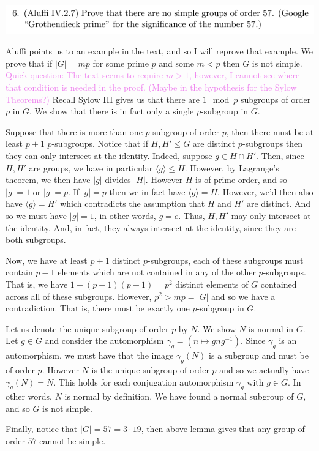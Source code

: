 \documentclass[12pt,letterpaper,boxed]{hmcpset}
\newcommand{\wg}[1]{\textcolor{violet}{#1}}
\newcommand{\abs}[1]{\left|#1\right|}
\newcommand{\inv}{^{-1}}
\newcommand{\anglee}[1]{\langle #1 \rangle}
\begin{document}
\newpage

\begin{problem}
	\includegraphics[scale=0.8]{6.png}
	\hfill
\end{problem}

\begin{solution}
Aluffi points us to an example in the text, and so I will reprove that
example. We prove that if $\abs{G} = mp$ for some prime $p$ and some
$m < p$ then $G$ is not simple. \wg{Quick question: The text seems to require $m > 1$,
however, I cannot see where that condition is needed in the proof.
(Maybe in the hypothesis for the Sylow Theorems?)}
Recall Sylow III gives us that there are $1\mod p$ subgroups of order
$p$ in $G$. We show that there is in fact only a single $p$-subgroup
in $G$.

Suppose that there is more than one $p$-subgroup of order
$p$, then there must be at least $p+1$ $p$-subgroups.
Notice that if $H,H' \leq G$ are distinct $p$-subgroups then they can
only intersect at the identity. Indeed, suppose $g \in H \cap H'$.
Then, since $H,H'$ are groups, we have in particular $\anglee g \leq
H$. However, by Lagrange's theorem, we then have $\abs{g}$ divides $\abs
H$. However $H$ is of prime order, and so $\abs{g} = 1$ or $\abs g =
p$. If $\abs g = p$ then we in fact have $\anglee g = H$. However, 
we'd then also have $\anglee g = H'$ which contradicts the assumption that
$H$ and $H'$ are distinct. And so we must have $\abs g = 1$, in other
words, $g = e$. Thus, $H,H'$ may only intersect at the identity. And,
in fact, they always intersect at the identity, since they are both
subgroups.

Now, we have at least $p+1$ distinct $p$-subgroups, each of these
subgroups must contain $p-1$ elements which are not contained in any
of the other $p$-subgroups. That is, we have $1 + (p+1)(p-1) = p^2$
distinct elements of $G$ contained across all of these subgroups. However, $p^2 > mp =
\abs G$ and so we have a contradiction. That is, there must be exactly
one $p$-subgroup in $G$.

Let us denote the unique subgroup of order $p$ by $N$.
We show $N$ is normal in $G$. Let $g \in
G$ and consider the automorphism $\gamma_g = (n \mapsto
g n g\inv)$. Since $\gamma_g$ is an automorphism, we must have that
the image $\gamma_g(N)$ is a subgroup and must be of order $p$. 
However $N$ is the unique subgroup of order $p$ and so we actually have $\gamma_g(N) =
N$. This holds for each conjugation automorphism $\gamma_g$ with $g
\in G$. In other words, $N$ is normal by definition. We have found a
normal subgroup of $G$, and so $G$ is not simple.

Finally, notice that $\abs G = 57 = 3 \cdot 19$, then above lemma
gives that any group of order $57$ cannot be simple.
\end{solution}
\end{document}
